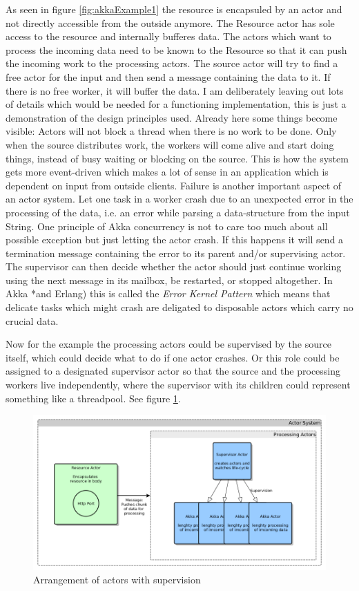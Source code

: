 \documentclass[11p]{scrartcl}
\begin{document}
As seen in figure \ref{fig:akkaExample1} the resource is encapsuled by an actor and not directly accessible from the outside anymore. The Resource actor has sole access to the resource and internally bufferes data. The actors which want to process the incoming data need to be known to the Resource so that it can push the incoming work to the processing actors. The source actor will try to find a free actor for the input and then send a message containing the data to it. If there is no free worker, it will buffer the data. I am deliberately leaving out lots of details which would be needed for a functioning implementation, this is just a demonstration of the design principles used.
Already here some things become visible: Actors will not block a thread when there is no work to be done. Only when the source distributes work, the workers will come alive and start doing things, instead of busy waiting or blocking on the source. This is how the system gets more event-driven which makes a lot of sense in an application which is dependent on input from outside clients.
Failure is another important aspect of an actor system. Let one task in a worker crash due to an unexpected error in the processing of the data, i.e. an error while parsing a data-structure from the input String. One principle of Akka concurrency is not to care too much about all possible exception but just letting the actor crash. If this happens it will send a termination message containing the error to its parent and/or supervising actor. 
The supervisor can then decide whether the actor should just continue working using the next message in its mailbox, be restarted, or stopped altogether.
In Akka *and Erlang) this is called the \textit{Error Kernel Pattern} which means that delicate tasks which might crash are deligated to disposable actors which carry no crucial data.

Now for the example the processing actors could be supervised by the source itself, which could decide what to do if one actor crashes. Or this role could be assigned to a designated supervisor actor so that the source and the processing workers live independently, where the supervisor with its children could represent something like a threadpool. See figure \ref{fig:akkaExample2}.

\begin{figure}[h]		
 	\includegraphics[scale=0.4]{figures/akkaExample2.png}
	\caption{Arrangement of actors with supervision}
	\label{fig:akkaExample2}
\end{figure}
\end{document}
